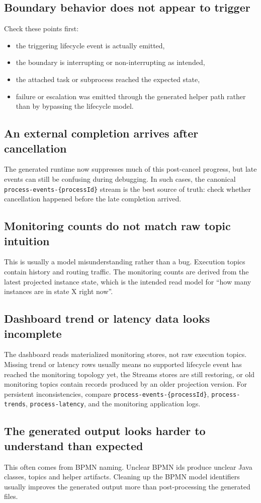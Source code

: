 \subsection{Boundary behavior does not appear to trigger}

Check these points first:
\begin{itemize}
\item the triggering lifecycle event is actually emitted,
\item the boundary is interrupting or non-interrupting as intended,
\item the attached task or subprocess reached the expected state,
\item failure or escalation was emitted through the generated helper path rather than by bypassing
the lifecycle model.
\end{itemize}

\subsection{An external completion arrives after cancellation}

The generated runtime now suppresses much of this post-cancel progress, but late events can still
be confusing during debugging. In such cases, the canonical \texttt{process-events-\{processId\}} stream is the
best source of truth: check whether cancellation happened before the late completion arrived.

\subsection{Monitoring counts do not match raw topic intuition}

This is usually a model misunderstanding rather than a bug. Execution topics contain history and
routing traffic. The monitoring counts are derived from the latest projected instance state, which
is the intended read model for ``how many instances are in state X right now''.

\subsection{Dashboard trend or latency data looks incomplete}

The dashboard reads materialized monitoring stores, not raw execution topics. Missing trend or
latency rows usually means no supported lifecycle event has reached the monitoring topology yet,
the Streams stores are still restoring, or old monitoring topics contain records produced by an
older projection version. For persistent inconsistencies, compare \texttt{process-events-\{processId\}},
\texttt{process-trends}, \texttt{process-latency}, and the monitoring application logs.

\subsection{The generated output looks harder to understand than expected}

This often comes from BPMN naming. Unclear BPMN ids produce unclear Java classes, topics and helper
artifacts. Cleaning up the BPMN model identifiers usually improves the generated output
more than post-processing the generated files.
